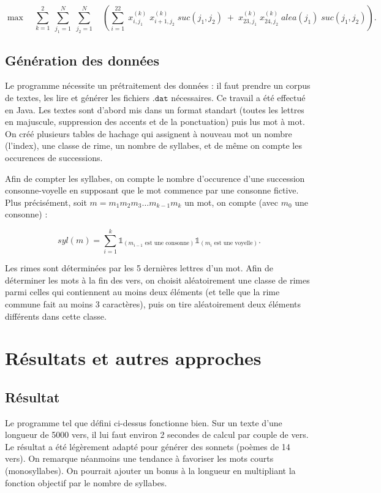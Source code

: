 \documentclass[a4paper,11pt]{article}
\begin{document}
\[ \max \quad  \sum_{k=1}^{2} \; \sum_{j_1=1}^{N} \; \sum_{j_2=1}^{N} \quad \left( \sum_{i=1}^{22} \; x_{i,j_1}^{(k)} \; x_{i+1,j_2}^{(k)} \; suc(j_1, j_2)  \; + \;
x_{23,j_1}^{(k)} \; x_{24,j_2}^{(k)} \; alea(j_1) \; suc(j_1, j_2) \right)
. \]


\subsection{Génération des données}

Le programme nécessite un prétraitement des données : il faut prendre un corpus de textes, les lire et générer les fichiers $\texttt{.dat}$ nécessaires. Ce travail a été effectué en Java. Les textes sont d'abord mis dans un format standart (toutes les lettres en majuscule, suppression des accents et de la ponctuation) puis lus mot à mot. On créé plusieurs tables de hachage qui assignent à nouveau mot un nombre (l'index), une classe de rime, un nombre de syllabes, et de même on compte les occurences de successions.

Afin de compter les syllabes, on compte le nombre d'occurence d'une succession consonne-voyelle en supposant que le mot commence par une consonne fictive. Plus précisément, soit $m = m_1m_2m_3 \ldots m_{k-1}m_k$ un mot, on compte (avec $m_0$ une consonne) :


\[ syl(m) = \sum_{i=1}^{k} \mathds{1}_{(m_{i-1} \text{ est une consonne})} \mathds{1}_{(m_{i} \text{ est une voyelle})}.\]


Les rimes sont déterminées par les 5 dernières lettres d'un mot. Afin de déterminer les mots à la fin des vers, on choisit aléatoirement une classe de rimes parmi celles qui contiennent au moins deux éléments (et telle que la rime commune fait au moins 3 caractères), puis on tire aléatoirement deux éléments différents dans cette classe. 

\section{Résultats et autres approches}

\subsection{Résultat}

Le programme tel que défini ci-dessus fonctionne bien. Sur un texte d'une longueur de 5000 vers, il lui faut environ 2 secondes de calcul par couple de vers. Le résultat a été légèrement adapté pour générer des sonnets (poèmes de 14 vers). On remarque néanmoins une tendance à favoriser les mots courts (monosyllabes). On pourrait ajouter un bonus à la longueur en multipliant la fonction objectif par le nombre de syllabes.
\end{document}

